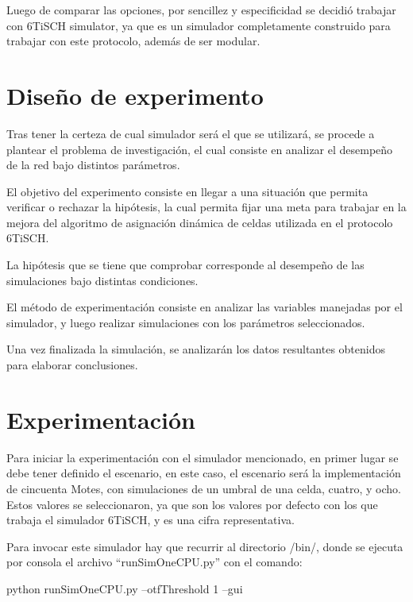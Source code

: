 Luego de comparar las opciones, por sencillez y especificidad se decidió trabajar con 6TiSCH simulator, ya que es un simulador completamente construido para trabajar con este protocolo, además de ser modular.

\section{Diseño de experimento}

Tras tener la certeza de cual simulador será el que se utilizará, se procede a plantear el problema de investigación, el cual consiste en analizar el desempeño de la red bajo distintos parámetros.

El objetivo del experimento consiste en llegar a una situación que permita verificar o rechazar la hipótesis, la cual permita fijar una meta para trabajar en la mejora del algoritmo de asignación dinámica de celdas utilizada en el protocolo 6TiSCH.

La hipótesis que se tiene que comprobar corresponde al desempeño de las simulaciones bajo distintas condiciones.

El método de experimentación consiste en analizar las variables manejadas por el simulador, y luego realizar simulaciones con los parámetros seleccionados.

Una vez finalizada la simulación, se analizarán los datos resultantes obtenidos para elaborar conclusiones.



\section{Experimentación}
Para iniciar la experimentación con el simulador mencionado, en primer lugar se debe tener definido el escenario, en este caso, el escenario será la implementación de cincuenta Motes, con simulaciones de un umbral de una celda, cuatro, y ocho.
Estos valores se seleccionaron, ya que son los valores por defecto con los que trabaja el simulador 6TiSCH, y es una cifra representativa.

Para invocar este simulador hay que recurrir al directorio {\ttfamily /bin/}, donde se ejecuta por consola el archivo ``runSimOneCPU.py'' con el comando:

\begin{ttfamily}
    python runSimOneCPU.py --otfThreshold 1 --gui

\end{ttfamily}



